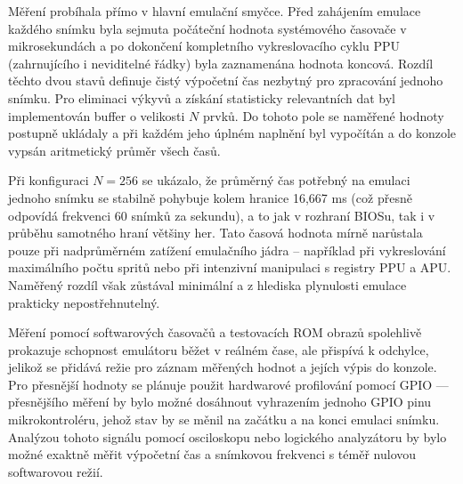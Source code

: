 %

Měření probíhala přímo v hlavní emulační smyčce. Před zahájením emulace každého snímku byla sejmuta
počáteční hodnota systémového časovače v mikrosekundách a po dokončení kompletního vykreslovacího
cyklu PPU (zahrnujícího i neviditelné řádky) byla zaznamenána hodnota koncová. Rozdíl těchto dvou
stavů definuje čistý výpočetní čas nezbytný pro zpracování jednoho snímku. Pro eliminaci výkyvů a
získání statisticky relevantních dat byl implementován buffer o velikosti $N$ prvků. Do tohoto pole
se naměřené hodnoty postupně ukládaly a při každém jeho úplném naplnění byl vypočítán a do konzole
vypsán aritmetický průměr všech časů.

Při konfiguraci $N=256$ se ukázalo, že průměrný čas potřebný na emulaci jednoho snímku se stabilně
pohybuje kolem hranice 16,667 ms (což přesně odpovídá frekvenci 60 snímků za sekundu), a to jak v
rozhraní BIOSu, tak i v průběhu samotného hraní většiny her. Tato časová hodnota mírně narůstala
pouze při nadprůměrném zatížení emulačního jádra -- například při vykreslování maximálního počtu
spritů nebo při intenzivní manipulaci s registry PPU a APU. Naměřený rozdíl však zůstával minimální
a z hlediska plynulosti emulace prakticky nepostřehnutelný.

Měření pomocí softwarových časovačů a testovacích ROM obrazů spolehlivě prokazuje schopnost
emulátoru běžet v reálném čase, ale přispívá k odchylce, jelikož se přidává režie pro záznam
měřených hodnot a jejích výpis do konzole. Pro přesnější hodnoty se plánuje použit hardwarové
profilování pomocí GPIO — přesnějšího měření by bylo možné dosáhnout vyhrazením jednoho GPIO pinu
mikrokontroléru, jehož stav by se měnil na začátku a na konci emulaci snímku. Analýzou tohoto
signálu pomocí osciloskopu nebo logického analyzátoru by bylo možné exaktně měřit výpočetní čas a
snímkovou frekvenci s téměř nulovou softwarovou režií.

